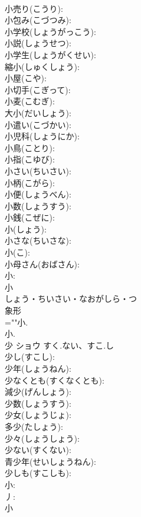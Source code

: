 \documentclass[8pt]{extreport}
\begin{document}
\begin{CJK}{UTF8}{min}
\\	小売り(こうり): 
\\	小包み(こづつみ): 
\\	小学校(しょうがっこう): 
\\	小説(しょうせつ): 
\\	小学生(しょうがくせい): 
\\	縮小(しゅくしょう): 
\\	小屋(こや): 
\\	小切手(こぎって): 
\\	小麦(こむぎ): 
\\	大小(だいしょう): 
\\	小遣い(こづかい): 
\\	小児科(しょうにか): 
\\	小鳥(ことり): 
\\	小指(こゆび): 
\\	小さい(ちいさい): 
\\	小柄(こがら): 
\\	小便(しょうべん): 
\\	小数(しょうすう): 
\\	小銭(こぜに): 
\\	小(しょう): 
\\	小さな(ちいさな): 
\\	小(こ): 
\\	小母さん(おばさん): 
\\	小: 
\\	小	
\\	しょう・ちいさい・なおがしら・つ	
\\	象形 
\\	=""小.
\\	小.
\\	少	ショウ	すく.ない、すこ.し		
\\	少し(すこし): 
\\	少年(しょうねん): 
\\	少なくとも(すくなくとも): 
\\	減少(げんしょう): 
\\	少数(しょうすう): 
\\	少女(しょうじょ): 
\\	多少(たしょう): 
\\	少々(しょうしょう): 
\\	少ない(すくない): 
\\	青少年(せいしょうねん): 
\\	少しも(すこしも): 
\\	小: 
\\	丿: 
\\	小	

\end{CJK}
\end{document}
